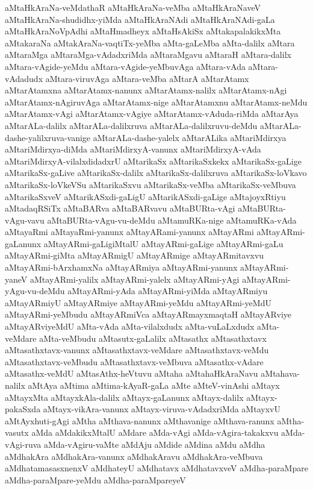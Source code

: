 {aMtaHkAraNa-veMdathaR
aMtaHkAraNa-veMba
aMtaHkAraNaveV
aMtaHkAraNa-shudidhx-yiMda
aMtaHkAraNAdi
aMtaHkAraNAdi-gaLa
aMtaHkAraNoVpAdhi
aMtaHmadheyx
aMtaHsAkiSx
aMtakapalakikxMta
aMtakaraNa
aMtakAraNa-vaqtiTx-yeMba
aMta-gaLeMba
aMta-dalilx
aMtara
aMtaraMga
aMtaraMga-vAdadxriMda
aMtaraMgavu
aMtaraH
aMtara-dalilx
aMtara-vAgide-yeMdu
aMtara-vAgide-yeMbuvAga
aMtara-vAda
aMtara-vAdadudx
aMtara-viruvAga
aMtara-veMba
aMtarA
aMtarAtamx
aMtarAtamxna
aMtarAtamx-nanunx
aMtarAtamx-nalilx
aMtarAtamx-nAgi
aMtarAtamx-nAgiruvAga
aMtarAtamx-nige
aMtarAtamxnu
aMtarAtamx-neMdu
aMtarAtamx-vAgi
aMtarAtamx-vAgiye
aMtarAtamx-vAduda-riMda
aMtarAya
aMtarALa-dalilx
aMtarALa-dalilxruva
aMtarALa-dalilxruvu-deMdu
aMtarALa-dashe-yalilxruva-vanige
aMtarALa-dashe-yalelx
aMtarALika
aMtariMdirxya
aMtariMdirxya-diMda
aMtariMdirxyA-vanunx
aMtariMdirxyA-vAda
aMtariMdirxyA-vilalxdidadxrU
aMtarikaSx
aMtarikaSxkekx
aMtarikaSx-gaLige
aMtarikaSx-gaLive
aMtarikaSx-dalilx
aMtarikaSx-dalilxruva
aMtarikaSx-loVkavo
aMtarikaSx-loVkeVSu
aMtarikaSxvu
aMtarikaSx-veMba
aMtarikaSx-veMbuva
aMtarikaSxveV
aMtarikASxdi-gaLigU
aMtarikASxdi-gaLige
aMtajoyxRtiyu
aMtadaqRSiTx
aMtaBARva
aMtaBARvavu
aMtaBURta-vAgi
aMtaBURta-vAgu-vavu
aMtaBURta-vAgu-vu-deMdu
aMtamuRKa-nige
aMtamuRKa-vAda
aMtayaRmi
aMtayaRmi-yanunx
aMtayARami-yanunx
aMtayARmi
aMtayARmi-gaLanunx
aMtayARmi-gaLigiMtalU
aMtayARmi-gaLige
aMtayARmi-gaLu
aMtayARmi-giMta
aMtayARmigU
aMtayARmige
aMtayARmitavxvu
aMtayARmi-bArxhamxNa
aMtayARmiya
aMtayARmi-yanunx
aMtayARmi-yaneV
aMtayARmi-yalilx
aMtayARmi-yalelx
aMtayARmi-yAgi
aMtayARmi-yAgu-vu-deMdu
aMtayARmi-yAda
aMtayARmi-yiMda
aMtayARmiyu
aMtayARmiyU
aMtayARmiye
aMtayARmi-yeMdu
aMtayARmi-yeMdU
aMtayARmi-yeMbudu
aMtayARmiVca
aMtayARmayxmaqtaH
aMtayARviye
aMtayARviyeMdU
aMta-vAda
aMta-vilalxdudx
aMta-vuLaLxdudx
aMta-veMdare
aMta-veMbudu
aMtasutx-gaLalilx
aMtasathx
aMtasathxtavx
aMtasathxtavx-vanunx
aMtasathxtavx-veMdare
aMtasathxtavx-veMdu
aMtasathxtavx-veMbudu
aMtasathxtavx-veMbuva
aMtasathx-vAdare
aMtasathx-veMdU
aMtasAthx-heVtuvu
aMtaha
aMtahaHkAraNavu
aMtahava-nalilx
aMtAya
aMtima
aMtima-kAyaR-gaLa
aMte
aMteV-vinAshi
aMtayx
aMtayxMta
aMtayxkAla-dalilx
aMtayx-gaLanunx
aMtayx-dalilx
aMtayx-pakaSxda
aMtayx-vikAra-vanunx
aMtayx-viruva-vAdadxriMda
aMtayxvU
aMtAyxhuti-gAgi
aMtha
aMthava-nanunx
aMthavanige
aMthava-ranunx
aMtha-vasutx
aMda
aMdakikxMtalU
aMdare
aMda-vAgi
aMda-vAgira-takakxvu
aMda-vAgi-ruva
aMda-vAgiru-vaMte
aMdAju
aMdide
aMdina
aMdu
aMdha
aMdhakAra
aMdhakAra-vanunx
aMdhakAravu
aMdhakAra-veMbuva
aMdhatamasasxnenxV
aMdhateyU
aMdhatavx
aMdhatavxveV
aMdha-paraMpare
aMdha-paraMpare-yeMdu
aMdha-paraMpareyeV
}
